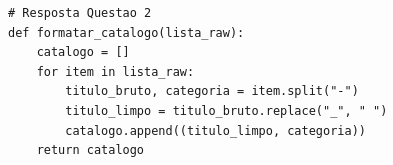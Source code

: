 \ifmostrarGabarito
\begin{verbatim}
# Resposta Questao 2
def formatar_catalogo(lista_raw):
    catalogo = []
    for item in lista_raw:
        titulo_bruto, categoria = item.split("-")
        titulo_limpo = titulo_bruto.replace("_", " ")
        catalogo.append((titulo_limpo, categoria))
    return catalogo
\end{verbatim}
\fi
